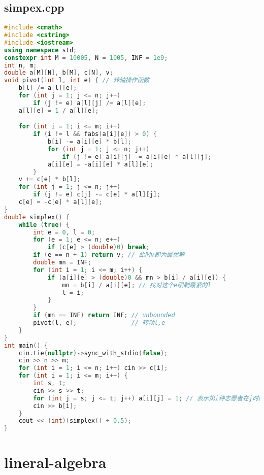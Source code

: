 \documentclass[9pt, a4paper, oneside]{book}
\begin{document}
\subsection{simpex.cpp}
\begin{lstlisting}[language={C++}]
#include <cmath>
#include <cstring>
#include <iostream>
using namespace std;
constexpr int M = 10005, N = 1005, INF = 1e9;
int n, m;
double a[M][N], b[M], c[N], v;
void pivot(int l, int e) { // 转轴操作函数
    b[l] /= a[l][e];
    for (int j = 1; j <= n; j++)
        if (j != e) a[l][j] /= a[l][e];
    a[l][e] = 1 / a[l][e];

    for (int i = 1; i <= m; i++)
        if (i != l && fabs(a[i][e]) > 0) {
            b[i] -= a[i][e] * b[l];
            for (int j = 1; j <= n; j++)
                if (j != e) a[i][j] -= a[i][e] * a[l][j];
            a[i][e] = -a[i][e] * a[l][e];
        }
    v += c[e] * b[l];
    for (int j = 1; j <= n; j++)
        if (j != e) c[j] -= c[e] * a[l][j];
    c[e] = -c[e] * a[l][e];
}
double simplex() {
    while (true) {
        int e = 0, l = 0;
        for (e = 1; e <= n; e++)
            if (c[e] > (double)0) break;
        if (e == n + 1) return v; // 此时v即为最优解
        double mn = INF;
        for (int i = 1; i <= m; i++) {
            if (a[i][e] > (double)0 && mn > b[i] / a[i][e]) {
                mn = b[i] / a[i][e]; // 找对这个e限制最紧的l
                l = i;
            }
        }
        if (mn == INF) return INF; // unbounded
        pivot(l, e);               // 转动l,e
    }
}
int main() {
    cin.tie(nullptr)->sync_with_stdio(false);
    cin >> n >> m;
    for (int i = 1; i <= n; i++) cin >> c[i];
    for (int i = 1; i <= m; i++) {
        int s, t;
        cin >> s >> t;
        for (int j = s; j <= t; j++) a[i][j] = 1; // 表示第i种志愿者在j时间可以服务
        cin >> b[i];
    }
    cout << (int)(simplex() + 0.5);
}\end{lstlisting}
\section{lineral-algebra}
\end{document}
